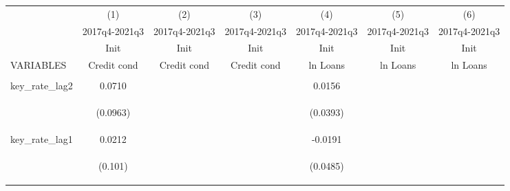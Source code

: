 \documentclass[]{article}
\begin{document}
\begin{center}
\begin{tabular}{lcccccc} \hline
 & (1) & (2) & (3) & (4) & (5) & (6) \\
 & 2017q4-2021q3 & 2017q4-2021q3 & 2017q4-2021q3 & 2017q4-2021q3 & 2017q4-2021q3 & 2017q4-2021q3 \\
 & Init & Init & Init & Init & Init & Init \\
VARIABLES & Credit cond & Credit cond & Credit cond & ln Loans & ln Loans & ln Loans \\ \hline
\vspace{4pt} & \begin{footnotesize}\end{footnotesize} & \begin{footnotesize}\end{footnotesize} & \begin{footnotesize}\end{footnotesize} & \begin{footnotesize}\end{footnotesize} & \begin{footnotesize}\end{footnotesize} & \begin{footnotesize}\end{footnotesize} \\
key\_rate\_lag2 & 0.0710 &  &  & 0.0156 &  &  \\
\vspace{4pt} & \begin{footnotesize}(0.0963)\end{footnotesize} & \begin{footnotesize}\end{footnotesize} & \begin{footnotesize}\end{footnotesize} & \begin{footnotesize}(0.0393)\end{footnotesize} & \begin{footnotesize}\end{footnotesize} & \begin{footnotesize}\end{footnotesize} \\
key\_rate\_lag1 & 0.0212 &  &  & -0.0191 &  &  \\
\vspace{4pt} & \begin{footnotesize}(0.101)\end{footnotesize} & \begin{footnotesize}\end{footnotesize} & \begin{footnotesize}\end{footnotesize} & \begin{footnotesize}(0.0485)\end{footnotesize} & \begin{footnotesize}\end{footnotesize} & \begin{footnotesize}\end{footnotesize} \\

\end{tabular}
\end{center}
\end{document}
